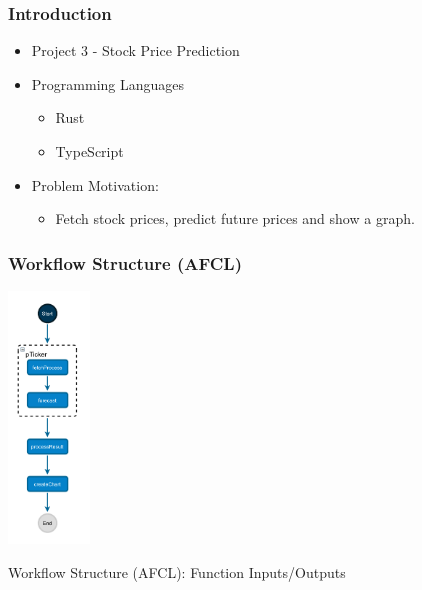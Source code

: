 \documentclass[11pt,t,usepdftitle=false,aspectratio=169]{beamer}
\begin{document}
\begin{frame}
\frametitle{Introduction}
  \begin{itemize}
    \item Project 3 - Stock Price Prediction
    \item Programming Languages
      \begin{itemize}
        \item Rust
        \item TypeScript
      \end{itemize}
    \item Problem Motivation:
      \begin{itemize}
        \item Fetch stock prices, predict future prices and show a graph.
      \end{itemize}
  \end{itemize}
\end{frame}

\begin{frame}
  \frametitle{Workflow Structure (AFCL)}
  \begin{center}
    \includegraphics[height=6.7cm, keepaspectratio]{./assets/afcl}
  \end{center}
\end{frame}

\begin{frame}{Workflow Structure (AFCL): Function Inputs/Outputs}
\end{frame}
\end{document}
